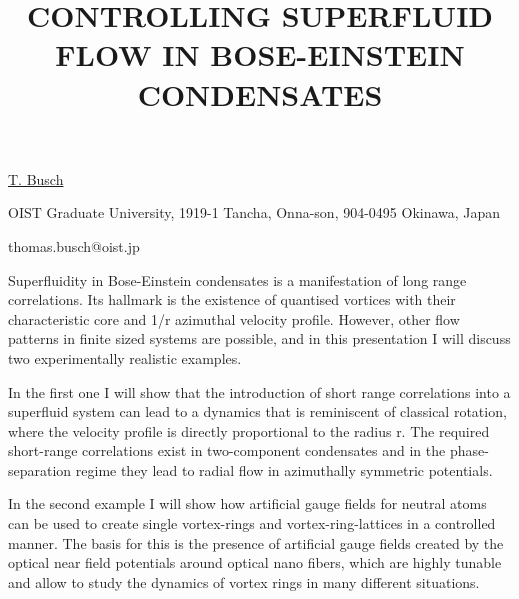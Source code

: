 \title{CONTROLLING SUPERFLUID FLOW IN BOSE-EINSTEIN CONDENSATES}

\underline{T. Busch} 

{\normalsize{\vspace{-4mm}
OIST Graduate University,
1919-1 Tancha, Onna-son,
904-0495 Okinawa, Japan

\email thomas.busch@oist.jp}}

Superfluidity in Bose-Einstein condensates is a manifestation of long range correlations. Its hallmark is the existence of quantised vortices with their characteristic core and 1/r azimuthal velocity profile. However, other flow patterns in finite sized systems are possible, and in this presentation I will discuss two experimentally realistic examples.

In the first one I will show that the introduction of short range correlations into a superfluid system can lead to a dynamics that is reminiscent of classical rotation, where the velocity profile is directly  proportional to the radius r. The required short-range correlations exist in two-component condensates and in the phase-separation regime they lead to radial flow in azimuthally symmetric potentials.

In the second example I will show how artificial gauge fields for neutral atoms can be used to create single vortex-rings and vortex-ring-lattices in a controlled manner. The basis for this is the presence of artificial gauge fields created by the optical near field potentials around optical nano fibers, which are highly tunable and allow to study the dynamics of vortex rings in many different situations.


\vspace{\baselineskip} 
